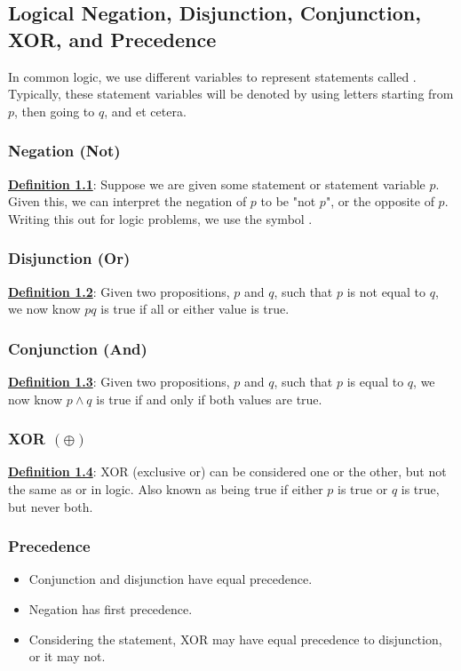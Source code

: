 \subsection{Logical Negation, Disjunction, Conjunction, XOR, and Precedence}
In common logic, we use different variables to represent statements called . Typically, these statement variables will be denoted by using letters starting from \(p\), then going to \(q\), and et cetera.

\subsubsection{Negation (Not)}
\textbf{\underline{Definition 1.1}}: Suppose we are given some statement or statement variable \(p\). Given this, we can interpret the negation of \(p\) to be "not \(p\)", or the opposite of \(p\). Writing this out for logic problems, we use the symbol .

\subsubsection{Disjunction (Or)}
\textbf{\underline{Definition 1.2}}:  Given two propositions, \(p\) and \(q\), such that \(p\) is not equal to \(q\), we now know \(p\)\lor\(q\) is true if all or either value is true.

\subsubsection{Conjunction (And)}
\textbf{\underline{Definition 1.3}}: Given two propositions, \(p\) and \(q\), such that \(p\) is equal to \(q\), we now know $p\land q$ is true if and only if both values are true.

\subsubsection{XOR $(\oplus)$}
\textbf{\underline{Definition 1.4}}: XOR (exclusive or) can be considered one or the other, but not the same as or in logic. Also known as being true if either \(p\) is true or \(q\) is true, but never both.

\subsubsection{Precedence}
\begin{itemize}
    \item Conjunction and disjunction have equal precedence.
    \item Negation has first precedence.
    \item Considering the statement, XOR may have equal precedence to disjunction, or it may not.
\end{itemize}

